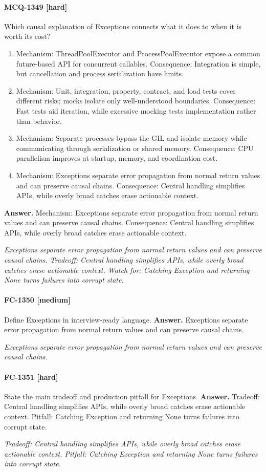 \paragraph{MCQ-1349 [hard]} Which causal explanation of Exceptions connects what it does to when it is worth its cost?
\begin{enumerate}[label=\Alph*.]
\item Mechanism: ThreadPoolExecutor and ProcessPoolExecutor expose a common future-based API for concurrent callables. Consequence: Integration is simple, but cancellation and process serialization have limits.
\item Mechanism: Unit, integration, property, contract, and load tests cover different risks; mocks isolate only well-understood boundaries. Consequence: Fast tests aid iteration, while excessive mocking tests implementation rather than behavior.
\item Mechanism: Separate processes bypass the GIL and isolate memory while communicating through serialization or shared memory. Consequence: CPU parallelism improves at startup, memory, and coordination cost.
\item Mechanism: Exceptions separate error propagation from normal return values and can preserve causal chains. Consequence: Central handling simplifies APIs, while overly broad catches erase actionable context.
\end{enumerate}
\noindent\textbf{Answer.} Mechanism: Exceptions separate error propagation from normal return values and can preserve causal chains. Consequence: Central handling simplifies APIs, while overly broad catches erase actionable context.
\par\textit{Exceptions separate error propagation from normal return values and can preserve causal chains. Tradeoff: Central handling simplifies APIs, while overly broad catches erase actionable context. Watch for: Catching Exception and returning None turns failures into corrupt state.}
\paragraph{FC-1350 [medium]} Define Exceptions in interview-ready language.
\noindent\textbf{Answer.} Exceptions separate error propagation from normal return values and can preserve causal chains.
\par\textit{Exceptions separate error propagation from normal return values and can preserve causal chains.}
\paragraph{FC-1351 [hard]} State the main tradeoff and production pitfall for Exceptions.
\noindent\textbf{Answer.} Tradeoff: Central handling simplifies APIs, while overly broad catches erase actionable context. Pitfall: Catching Exception and returning None turns failures into corrupt state.
\par\textit{Tradeoff: Central handling simplifies APIs, while overly broad catches erase actionable context. Pitfall: Catching Exception and returning None turns failures into corrupt state.}
